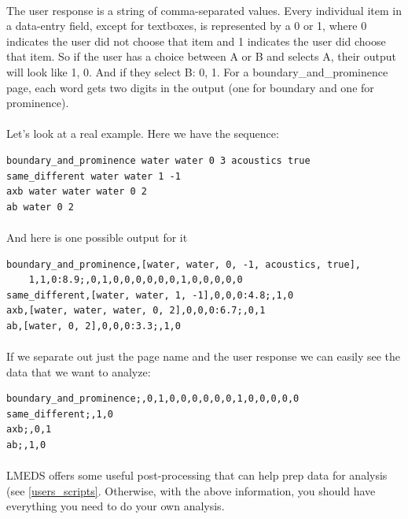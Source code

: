 \documentclass[12pt, oneside]{scrbook}   	%
\begin{document}
\paragraph{}
The user response is a string of comma-separated values.  Every individual item in a data-entry field, except for textboxes, is represented by a 0 or 1, where 0 indicates the user did not choose that item and 1 indicates the user did choose that item.  So if the user has a choice between A or B and selects A, their output will look like 1, 0.  And if they select B: 0, 1.  For a boundary\_and\_prominence page, each word gets two digits in the output (one for boundary and one for prominence).

\paragraph{}
Let's look at a real example.  Here we have the sequence:

\begin{lstlisting}
boundary_and_prominence water water 0 3 acoustics true
same_different water water 1 -1
axb water water water 0 2
ab water 0 2
\end{lstlisting}

\paragraph{}
And here is one possible output for it

\begin{lstlisting}
boundary_and_prominence,[water, water, 0, -1, acoustics, true],
	1,1,0:8.9;,0,1,0,0,0,0,0,0,1,0,0,0,0,0
same_different,[water, water, 1, -1],0,0,0:4.8;,1,0
axb,[water, water, water, 0, 2],0,0,0:6.7;,0,1
ab,[water, 0, 2],0,0,0:3.3;,1,0
\end{lstlisting}

\paragraph{}
If we separate out just the page name and the user response we can easily see the data that we want to analyze: 

\begin{lstlisting}
boundary_and_prominence;,0,1,0,0,0,0,0,0,1,0,0,0,0,0
same_different;,1,0
axb;,0,1
ab;,1,0
\end{lstlisting}

\paragraph{}
LMEDS offers some useful post-processing that can help prep data for analysis (see \ref{users_scripts}.  Otherwise, with the above information, you should have everything you need to do your own analysis.
\end{document}
